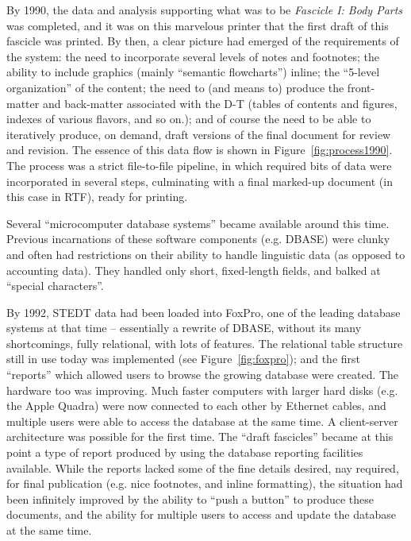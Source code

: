 By 1990, the data and analysis supporting what was to be {\it Fascicle
  I: Body Parts} was completed, and it was on this marvelous printer that the
first draft of this fascicle was printed.  By then, a clear picture
had emerged of the requirements of the system: the need to incorporate
several levels of notes and footnotes; the ability to include graphics
(mainly ``semantic flowcharts'') inline; the ``5-level organization''
of the content; the need to (and means to) produce the front-matter
and back-matter associated with the D-T (tables of contents and
figures, indexes of various flavors, and so on.);
and of course the need to be able to iteratively produce, on demand, 
draft versions of the final document for review and revision.  
The essence of this data flow is shown in  Figure~\ref{fig:process1990}.  
The process was a strict file-to-file
pipeline, in which required bits of data were incorporated in several
steps, culminating with a final marked-up document (in this case in
RTF), ready for printing.  

Several ``microcomputer database systems'' became available around this
time. Previous incarnations of these software components (e.g. DBASE\texttrademark) were clunky
and often had restrictions on their ability to handle linguistic data
(as opposed to accounting data).
They handled only short, fixed-length fields, and balked at ``special characters''.

By 1992, STEDT data had been loaded into FoxPro\texttrademark, one of the leading
database systems at that time -- essentially a rewrite of DBASE,
without its many shortcomings, fully relational, with lots of features.
The relational table structure still in use today
was implemented (see Figure~\ref{fig:foxpro}); and the first
``reports'' which allowed users to
browse the growing database were created.  The hardware too was
improving.
Much faster computers with larger hard disks (e.g. the
Apple Quadra\texttrademark) were now connected to each other by Ethernet
cables, and multiple users were able to access the database at the
same time.  A client-server architecture was possible for the first
time.  The ``draft fascicles'' became at this point a type of report
produced by using the database reporting facilities available. While the
reports lacked some of the fine details desired, nay required, for
final publication (e.g. nice footnotes, and inline formatting), the
situation had been infinitely improved by the ability to ``push a
button'' to produce these documents, and the ability for multiple
users to access and update the database at the same time.


